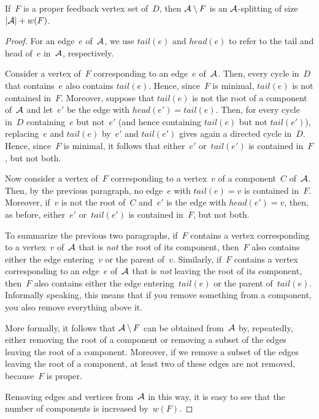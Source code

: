\begin{lemma}
If~$F$ is a proper feedback vertex set of~$D$, then ${\mathcal A}\setminus F$ is an ${\mathcal A}$-splitting of size $|{\mathcal A}| + w(F)$.
\end{lemma}
\begin{proof}
For an edge~$e$ of~${\mathcal A}$, we use $tail(e)$ and $head(e)$ to refer to the tail and head of~$e$ in~${\mathcal A}$, respectively.

Consider a vertex of~$F$ corresponding to an edge~$e$ of~${\mathcal A}$. Then, every cycle in~$D$ that contains~$e$ also contains $tail(e)$. Hence, since~$F$ is minimal, $tail(e)$ is not contained in~$F$. Moreover, suppose that $tail(e)$ is not the root of a component of~${\mathcal A}$ and let~$e'$ be the edge with $head(e')=tail(e)$. Then, for every cycle in~$D$ containing~$e$ but not~$e'$ (and hence containing $tail(e)$ but not $tail(e')$), replacing~$e$ and $tail(e)$ by~$e'$ and $tail(e')$ gives again a directed cycle in~$D$. Hence, since~$F$ is minimal, it follows that either~$e'$ or~$tail(e')$ is contained in~$F$, but not both.

Now consider a vertex of~$F$ corresponding to a vertex~$v$ of a component~$C$ of~${\mathcal A}$. Then, by the previous paragraph, no edge~$e$ with $tail(e)=v$ is contained in~$F$. Moreover, if~$v$ is not the root of~$C$ and~$e'$ is the edge with $head(e')=v$, then, as before, either~$e'$ or~$tail(e')$ is contained in~$F$, but not both.

To summarize the previous two paragraphs, if~$F$ contains a vertex corresponding to a vertex~$v$ of~${\mathcal A}$ that is \emph{not} the root of its component, then~$F$ also contains either the edge entering~$v$ or the parent of~$v$. Similarly, if~$F$ contains a vertex corresponding to an edge~$e$ of~${\mathcal A}$ that is \emph{not} leaving the root of its component, then~$F$ also contains either the edge entering~$tail(e)$ or the parent of~$tail(e)$. Informally speaking, this means that if you remove something from a component, you also remove everything above it.

More formally, it follows that ${\mathcal A}\setminus F$ can be obtained from~${\mathcal A}$ by, repeatedly, either removing the root of a component or removing a subset of the edges leaving the root of a component. Moreover, if we remove a subset of the edges leaving the root of a component, at least two of these edges are not removed, because~$F$ is proper.

Removing edges and vertices from~${\mathcal A}$ in this way, it is easy to see that the number of components is increased by~$w(F)$.
\end{proof}

